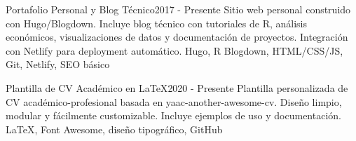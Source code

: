 \begin{projects}


	\project
	{Portafolio Personal y Blog Técnico}{2017 - Presente}
	{ }
	{Sitio web personal construido con Hugo/Blogdown. Incluye blog técnico con tutoriales de R, análisis económicos, visualizaciones de datos y documentación de proyectos. Integración con Netlify para deployment automático.}
	{Hugo, R Blogdown, HTML/CSS/JS, Git, Netlify, SEO básico}
	\emptySeparator

	\project
	{Plantilla de CV Académico en LaTeX}{2020 - Presente}
	{ }
	{Plantilla personalizada de CV académico-profesional basada en yaac-another-awesome-cv. Diseño limpio, modular y fácilmente customizable. Incluye ejemplos de uso y documentación.}
	{LaTeX, Font Awesome, diseño tipográfico, GitHub}
	\emptySeparator





\end{projects}
